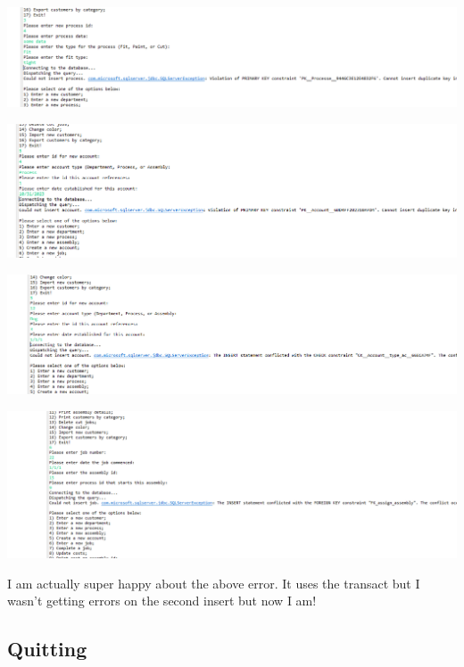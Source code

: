 \documentclass[11pt]{article}
\begin{document}
\includegraphics[width = \textwidth]{error3.png}

\includegraphics[width = \textwidth]{error4.png}

\includegraphics[width = \textwidth]{error5.png}

\includegraphics[width = \textwidth]{job4.png}

I am actually super happy about the above error.  It uses the transact but I wasn't getting errors on the second insert but now I am!  




\subsection{Quitting}
\end{document}
